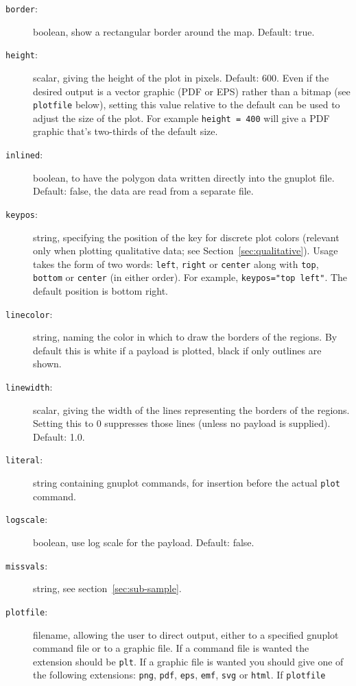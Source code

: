 \documentclass{article}
\begin{document}
\begin{description}
\item[\texttt{border}:] boolean, show a rectangular border around the
  map. Default: true.
\item[\texttt{height}:] scalar, giving the height of the plot in
  pixels. Default: 600. Even if the desired output is a vector graphic
  (PDF or EPS) rather than a bitmap (see \texttt{plotfile} below),
  setting this value relative to the default can be used to adjust the
  size of the plot. For example \texttt{height = 400} will give a PDF
  graphic that's two-thirds of the default size.
\item[\texttt{inlined}:] boolean, to have the polygon data written
  directly into the \textsf{gnuplot} file. Default: false, the data
  are read from a separate file.
\item[\texttt{keypos}:] string, specifying the position of the key for discrete
  plot colors (relevant only when plotting qualitative data; see
  Section~\ref{sec:qualitative}).  Usage takes the form of two words:
  \texttt{left}, \texttt{right} or \texttt{center} along with \texttt{top},
  \texttt{bottom} or \texttt{center} (in either order). For example,
  \verb|keypos="top left"|. The default position is bottom right.
\item[\texttt{linecolor}:] string, naming the color in which to draw
  the borders of the regions. By default this is white if a payload is
  plotted, black if only outlines are shown.
\item[\texttt{linewidth}:] scalar, giving the width of the lines
  representing the borders of the regions. Setting this to 0
  suppresses those lines (unless no payload is supplied). Default:
  1.0.
\item[\texttt{literal}:] string containing \textsf{gnuplot} commands,
  for insertion before the actual \texttt{plot} command.
\item[\texttt{logscale}:] boolean, use log scale for the
  payload. Default: false.
\item[\texttt{missvals}:] string, see section~\ref{sec:sub-sample}.
\item[\texttt{plotfile}:] filename, allowing the user to direct
  output, either to a specified \textsf{gnuplot} command file or to a
  graphic file. If a command file is wanted the extension should be
  \texttt{plt}. If a graphic file is wanted you should give one of the
  following extensions: \texttt{png}, \texttt{pdf}, \texttt{eps},
  \texttt{emf}, \texttt{svg} or \texttt{html}.  If \texttt{plotfile}

\end{description}
\end{document}

